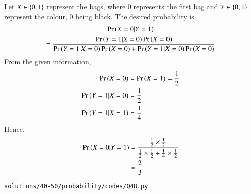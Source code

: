 Let $X \in \left\{0,1\right\}$ represent the bags, where 0 represents the first bag and $Y \in \left\{0,1\right\}$ represent the colour, 0 being black.
The desired probability is
{\footnotesize
\begin{multline}
\Pr\left(X=0|Y=1\right) 
\\
= \frac{\Pr\left(Y=1|X=0\right)\Pr\left(X=0\right)}{\Pr\left(Y=1|X=0\right)\Pr\left(X=0\right)+\Pr\left(Y=1|X=0\right)\Pr\left(X=0\right)}
\end{multline}
}
From the given information, 
\begin{align}
\Pr\left(X=0\right)&=\Pr\left(X=1\right)=\frac{1}{2}
\\
\Pr\left(Y=1|X=0\right)&=\frac{1}{2}
\\
\Pr\left(Y=1|X=1\right)&=\frac{1}{4}
\end{align}
Hence, 
\begin{align}
\Pr\left(X=0|Y=1\right) &= \frac{\frac{1}{2}\times \frac{1}{2}}{\frac{1}{2}\times \frac{1}{2}+\frac{1}{4}\times \frac{1}{2}}
\\
&=\frac{2}{3}
\end{align}
\begin{lstlisting}
solutions/40-50/probability/codes/Q48.py
\end{lstlisting}
